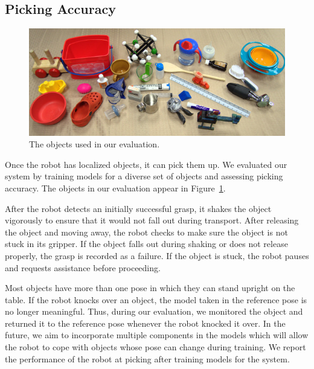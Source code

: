 \documentclass[graybox]{svmult}
\begin{document}
\subsection{Picking Accuracy}

\begin{figure}
\includegraphics[width=1\linewidth]{figures/object_glory_shot.jpg}
\caption{The objects used in our evaluation.\label{fig:object_glory_shot}}
\end{figure}

Once the robot has localized objects, it can pick them up.  We
evaluated our system by training models for a diverse set of objects
and assessing picking accuracy.  The objects in our evaluation appear
in Figure~\ref{fig:object_glory_shot}.

After the robot detects an initially successful grasp, it shakes the
object vigorously to ensure that it would not fall out during
transport. After releasing the object and moving away, the robot
checks to make sure the object is not stuck in its gripper. If the
object falls out during shaking or does not release properly, the
grasp is recorded as a failure. If the object is stuck, the robot
pauses and requests assistance before proceeding.

Most objects have more than one pose in which they can stand upright
on the table. If the robot knocks over an object, the model taken in
the reference pose is no longer meaningful. Thus, during our
evaluation, we monitored the object and returned it to the reference
pose whenever the robot knocked it over. In the future, we aim to
incorporate multiple components in the models which will allow the
robot to cope with objects whose pose can change during training.  We
report the performance of the robot at picking after training models
for the system.
\end{document}
